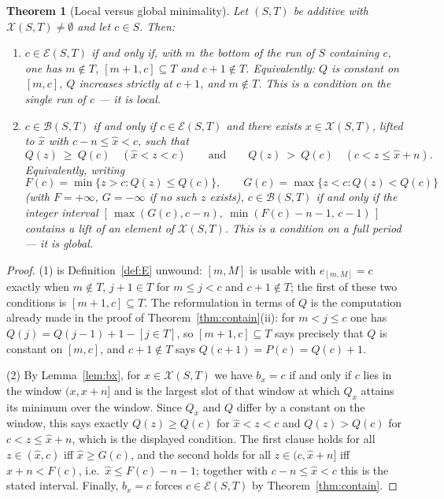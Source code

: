 \documentclass[11pt]{article}
\newtheorem{thm}{Theorem}[section]
\theoremstyle{definition}
\newcommand{\XX}{\mathcal{X}}
\newcommand{\EE}{\mathcal{E}}
\newcommand{\BB}{\mathcal{B}}
\begin{document}
\begin{thm}[Local versus global minimality]\label{thm:charac}
Let $(S,T)$ be additive with $\XX(S,T)\ne\emptyset$ and let $c\in S$. Then:
\begin{enumerate}
\item $c\in\EE(S,T)$ if and only if, with $m$ the bottom of the run of $S$ containing $c$, one
has $m\notin T$, $[m+1,c]\subseteq T$ and $c+1\notin T$. Equivalently: $Q$ is constant on
$[m,c]$, $Q$ increases strictly at $c+1$, and $m\notin T$. This is a condition on the single
run of $c$ --- it is \emph{local}.
\item $c\in\BB(S,T)$ if and only if $c\in\EE(S,T)$ and there exists $x\in\XX(S,T)$, lifted to
$\hat x$ with $c-n\le\hat x<c$, such that
\[
  Q(z)\ \ge\ Q(c)\quad (\hat x<z<c)
  \qquad\text{and}\qquad
  Q(z)\ >\ Q(c)\quad (c<z\le \hat x+n).
\]
Equivalently, writing
\[
  F(c)=\min\{z>c: Q(z)\le Q(c)\},\qquad G(c)=\max\{z<c: Q(z)<Q(c)\}
\]
(with $F=+\infty$, $G=-\infty$ if no such $z$ exists), $c\in\BB(S,T)$ if and only if the
integer interval $[\,\max(G(c),c-n),\ \min(F(c)-n-1,\,c-1)\,]$ contains a lift of an element of
$\XX(S,T)$. This is a condition on a full period --- it is \emph{global}.
\end{enumerate}
\end{thm}

\begin{proof}
(1) is Definition~\ref{def:E} unwound: $[m,M]$ is usable with $e_{[m,M]}=c$ exactly when
$m\notin T$, $j+1\in T$ for $m\le j<c$ and $c+1\notin T$; the first of these two conditions is
$[m+1,c]\subseteq T$. The reformulation in terms of $Q$ is the computation already made in the
proof of Theorem~\ref{thm:contain}(ii): for $m<j\le c$ one has $Q(j)=Q(j-1)+1-[j\in T]$, so
$[m+1,c]\subseteq T$ says precisely that $Q$ is constant on $[m,c]$, and $c+1\notin T$ says
$Q(c+1)=P(c)=Q(c)+1$.

(2) By Lemma~\ref{lem:bx}, for $x\in\XX(S,T)$ we have $b_x=c$ if and only if $c$ lies in the
window $(x,x+n]$ and is the largest slot of that window at which $Q_x$ attains its minimum over
the window. Since $Q_x$ and $Q$ differ by a constant on the window, this says exactly
$Q(z)\ge Q(c)$ for $\hat x<z<c$ and $Q(z)>Q(c)$ for $c<z\le\hat x+n$, which is the displayed
condition. The first clause holds for all $z\in(\hat x,c)$ iff $\hat x\ge G(c)$, and the second
holds for all $z\in(c,\hat x+n]$ iff $\hat x+n<F(c)$, i.e.\ $\hat x\le F(c)-n-1$; together with
$c-n\le\hat x<c$ this is the stated interval. Finally, $b_x=c$ forces $c\in\EE(S,T)$ by
Theorem~\ref{thm:contain}.
\end{proof}
\end{document}
